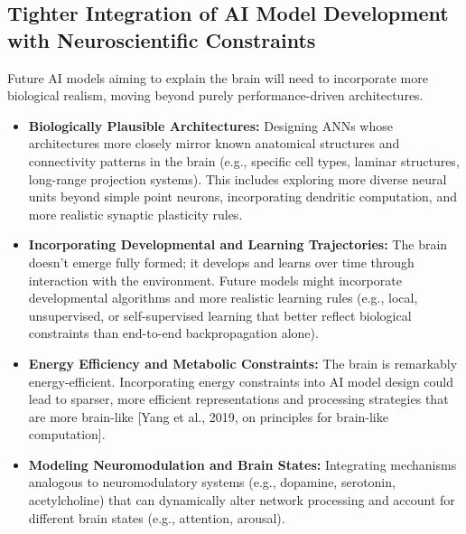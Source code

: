 \documentclass[11pt,a4paper]{article}
\begin{document}
\subsection{Tighter Integration of AI Model Development with Neuroscientific Constraints}
Future AI models aiming to explain the brain will need to incorporate more biological realism, moving beyond purely performance-driven architectures.
\begin{itemize}
    \item \textbf{Biologically Plausible Architectures:} Designing ANNs whose architectures more closely mirror known anatomical structures and connectivity patterns in the brain (e.g., specific cell types, laminar structures, long-range projection systems). This includes exploring more diverse neural units beyond simple point neurons, incorporating dendritic computation, and more realistic synaptic plasticity rules.
    \item \textbf{Incorporating Developmental and Learning Trajectories:} The brain doesn't emerge fully formed; it develops and learns over time through interaction with the environment. Future models might incorporate developmental algorithms and more realistic learning rules (e.g., local, unsupervised, or self-supervised learning that better reflect biological constraints than end-to-end backpropagation alone).
    \item \textbf{Energy Efficiency and Metabolic Constraints:} The brain is remarkably energy-efficient. Incorporating energy constraints into AI model design could lead to sparser, more efficient representations and processing strategies that are more brain-like [Yang et al., 2019, on principles for brain-like computation].
    \item \textbf{Modeling Neuromodulation and Brain States:} Integrating mechanisms analogous to neuromodulatory systems (e.g., dopamine, serotonin, acetylcholine) that can dynamically alter network processing and account for different brain states (e.g., attention, arousal).
\end{itemize}
\end{document}
